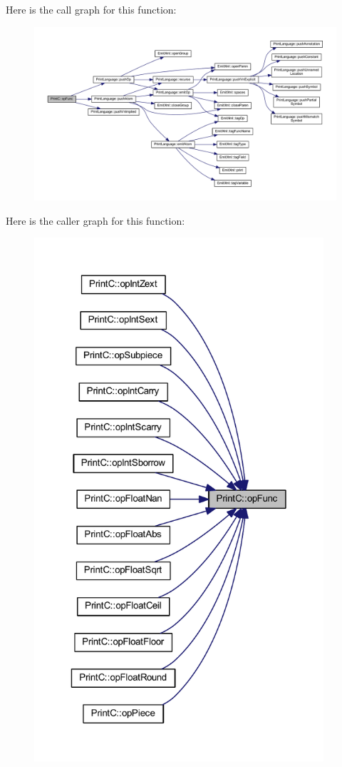 Here is the call graph for this function\+:
\nopagebreak
\begin{figure}[H]
\begin{center}
\leavevmode
\includegraphics[width=350pt]{class_print_c_a436588b5fb6b79a094c61db84eff9297_cgraph}
\end{center}
\end{figure}
Here is the caller graph for this function\+:
\nopagebreak
\begin{figure}[H]
\begin{center}
\leavevmode
\includegraphics[height=550pt]{class_print_c_a436588b5fb6b79a094c61db84eff9297_icgraph}
\end{center}
\end{figure}
\mbox{\label{class_print_c_abb10837d3ba1eea3582bceeb48b682c0}} 
